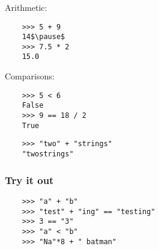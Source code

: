 \documentclass[notes]{beamer}
\begin{document}
\begin{frame}[fragile]
\begin{itemize}
        
        
        
    \end{itemize}
\end{frame}

\begin{frame}[fragile]
    \frametitle{}
    
    Arithmetic:
    
    \begin{lstlisting}
    >>> 5 + 9
    14$\pause$
    >>> 7.5 * 2
    15.0
    \end{lstlisting}
    
    \pause
    
    Comparisons:
    
    \begin{lstlisting}
    >>> 5 < 6
    False
    >>> 9 == 18 / 2
    True
    \end{lstlisting}
    
    \pause

    \begin{lstlisting}
    >>> "two" + "strings"
    "twostrings" 
    \end{lstlisting}
\end{frame}

\begin{frame}[fragile]
    \frametitle{Try it out}

    \begin{lstlisting}
    >>> "a" + "b"
    >>> "test" + "ing" == "testing"
    >>> 3 == "3"
    >>> "a" < "b"
    >>> "Na"*8 + " batman"
    \end{lstlisting}
\end{frame}
\end{document}

